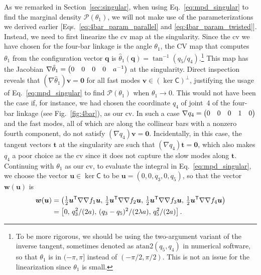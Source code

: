 As we remarked in Section~\ref{sec:singular}, when using Eq.~\eqref{eq:mpd_singular} to find the marginal density $\mathscr{P}(\mathscr{\theta}_{1})$, we will not make use of the parameterizations we derived earlier [Eqs.~\eqref{eq:4bar_param_parallel} and \eqref{eq:4bar_param_twisted}].
Instead, we need to first linearize the \ac{cv} map at the singularity.
Since the \ac{cv} we have chosen for the four-bar linkage is the angle $\theta_{1}$, the CV map that computes $\theta_{1}$ from the configuration vector $\bm{q}$ is $\hat{\theta}_{1}(\bm{q}) = \tan^{-1}(q_{5}/q_{4})$.\footnote{To be more rigorous, we should be using the two-argument variant of the inverse tangent, sometimes denoted as $\mathrm{atan2}(q_{5},q_{4})$ in numerical software, so that $\theta_{1}$ is in $(-\pi, \pi]$ instead of $(-\pi/2,\pi/2)$.  This is not an issue for the linearization since $\theta_{1}$ is small.}
This map has the Jacobian $\nabla\hat{\theta}_1 = \begin{pmatrix}0 & 0 & 0 & 0 & a^{-1}\end{pmatrix}$ at the singularity.
Direct inspection reveals that $(\nabla\hat{\theta}_{1})\bm{v} = \bm{0}$ for all fast modes $\bm{v} \in (\ker\mathsf{C})^{\perp}$, justifying the usage of Eq.~\eqref{eq:mpd_singular} to find $\mathscr{P}(\mathscr{\theta}_{1})$ when $\theta_{1} \to 0$.
This would not have been the case if, for instance, we had chosen the coordinate $q_{4}$ of joint~4 of the four-bar linkage (see Fig.~\ref{fig:4bar}), as our \ac{cv}.
In such a case $\nabla{q_{4}} = \begin{pmatrix}0 & 0 & 0 & 1 & 0\end{pmatrix}$ and the fast modes, all of which are along the collinear bars with a nonzero fourth component, do not satisfy $(\nabla q_{4})\bm{v} = \bm{0}$.
Incidentally, in this case, the tangent vectors $\bm{t}$ at the singularity are such that $(\nabla q_{4})\bm{t} = \bm{0}$, which also makes $q_{4}$ a poor choice as the \ac{cv} since it does not capture the slow modes along $\bm{t}$.
Continuing with $\theta_{1}$ as our \ac{cv}, to evaluate the integral in Eq.~\eqref{eq:mpd_singular}, we choose the vector $\bm{u} \in \ker \mathsf{C}$ to be $\bm{u} = (0, 0, q_3, 0, q_{5})$, so that the vector $\bm{w}(\bm{u})$ is
%
\begin{equation}
  \begin{aligned}
    \bm{w}(\bm{u}) &= \left(\tfrac{1}{2}\bm{u}^\mathsf{T} \nabla\nabla f_1 \bm{u},\, \tfrac{1}{2}\bm{u}^\mathsf{T}\nabla\nabla f_2\bm{u},\, \tfrac{1}{2}\bm{u}^\mathsf{T}\nabla\nabla f_3\bm{u},\, \tfrac{1}{2}\bm{u}^\mathsf{T}\nabla\nabla f_4\bm{u} \right)\\
      &= \left[0,\,q_3^2/(2a),\,(q_3-q_5)^2/(2\lambda a),\,q_5^2/(2a)\right].
  \end{aligned}
  \label{eq:4bar_w}
\end{equation}
